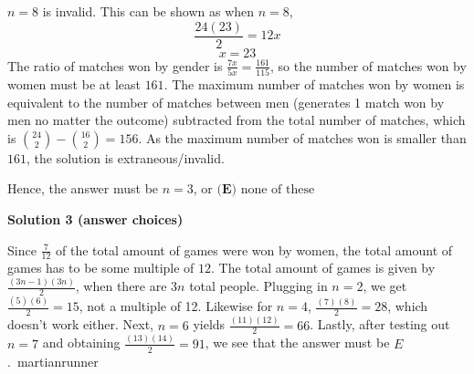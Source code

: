 \begin{enumerate}
 $n=8$ is invalid. This can be shown as when $n=8$,
 \[\frac{24(23)}{2}=12x\]
 \[x=23\]The ratio of matches won by gender is $\frac{7x}{5x}=\frac{161}{115}$, so the number of matches won by women must be at least $161$. The maximum number of matches won by women is equivalent to the number of matches between men (generates 1 match won by men no matter the outcome) subtracted from the total number of matches, which is $\binom{24}{2}-\binom{16}{2}=156$. As the maximum number of matches won is smaller than $161$, the solution is extraneous/invalid.

 Hence, the answer must be $n=3$, or $\boxed{\textbf{(E) }\text{none of these}}$




\textbf{Solution 3 (answer choices)}

Since $\frac{7}{12}$ of the total amount of games were won by women, the total amount of games has to be some multiple of $12$. The total amount of games is given by $\frac{(3n-1)(3n)}{2}$, when there are $3n$ total people. Plugging in $n=2$, we get $\frac{(5)(6)}{2}=15$, not a multiple of 12. Likewise for $n=4$, $\frac{(7)(8)}{2}=28$, which doesn't work either. Next, $n=6$ yields $\frac{(11)(12)}{2}=66$. Lastly, after testing out $n=7$ and obtaining $\frac{(13)(14)}{2}=91$, we see that the answer must be $\boxed{E}$.~martianrunner

 


\end{enumerate}